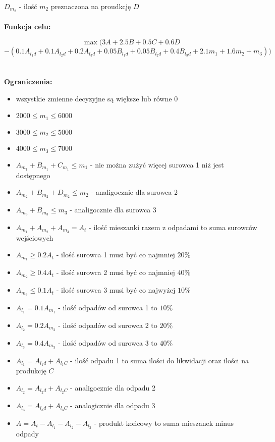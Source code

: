 \documentclass[12pt, a4paper]{article}
\begin{document}
$D_{m_2}$ - ilość $m_2$ preznaczona na proudkcję $D$
\\
\\
\textbf{Funkcja celu:}

\[\max (3A + 2.5B + 0.5C + 0.6D\]
\[- (0.1A_{l_1d} + 0.1A_{l_2d} + 0.2A_{l_3d} + 0.05B_{l_1d} + 0.05B_{l_2d} + 0.4B_{l_3d} + 2.1m_1 + 1.6m_2 + m_3))\]
\\
\\
\textbf{Ograniczenia:}

\begin{itemize}
  \item wszystkie zmienne decyzyjne są większe lub równe 0
  \item $2000 \leq m_1 \leq 6000$
  \item $3000 \leq m_2 \leq 5000$
  \item $4000 \leq m_3 \leq 7000$
  \item $A_{m_1} + B_{m_1} + C_{m_1} \leq m_1$ - nie można zużyć więcej surowca 1 niż jest dostępnego
  \item $A_{m_2} + B_{m_2} + D_{m_2} \leq m_2$ - analigocznie dla surowca 2
  \item $A_{m_3} + B_{m_3} \leq m_3$ - analigocznie dla surowca 3
  \item $A_{m_1} + A_{m_2} + A_{m_3} = A_t$ - ilość mieszanki razem z odpadami to suma surowców wejściowych
  \item $A_{m_1} \geq 0.2A_t$ - ilość surowca 1 musi być co najmniej $20\%$
  \item $A_{m_2} \geq 0.4A_t$ - ilość surowca 2 musi być co najmniej $40\%$
  \item $A_{m_3} \leq 0.1A_t$ - ilość surowca 3 musi być co najwyżej $10\%$
  \item $A_{l_1} = 0.1A_{m_1}$ - ilość odpadów od surowca 1 to $10\%$
  \item $A_{l_2} = 0.2A_{m_2}$ - ilość odpadów od surowca 2 to $20\%$
  \item $A_{l_3} = 0.4A_{m_3}$ - ilość odpadów od surowca 3 to $40\%$
  \item $A_{l_1} = A_{l_1d} + A_{l_1C}$ - ilość odpadu 1 to suma ilości do likwidacji oraz ilości na produkcję $C$ 
  \item $A_{l_2} = A_{l_2d} + A_{l_2C}$ - analigocznie dla odpadu 2
  \item $A_{l_3} = A_{l_3d} + A_{l_3C}$ - analogicznie dla odpadu 3
  \item $A = A_t - A_{l_1} - A_{l_2} - A_{l_3}$ - produkt końcowy to suma mieszanek minus odpady


\end{itemize}
\end{document}
